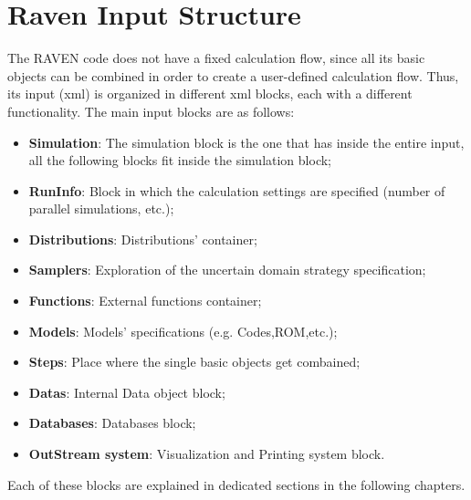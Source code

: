 \section{Raven Input Structure  \\ \vspace{2 mm} {\small }}
The RAVEN code does not have a fixed calculation flow, since all its basic objects can be combined in order to create a user-defined calculation flow. Thus, its input (xml) is organized in different xml blocks, each with a different functionality. 
The main input blocks are as follows:
\begin{itemize}
\item \textbf{Simulation}: The simulation block is the one that has inside the entire input, all the following blocks fit inside the simulation block;
\item \textbf{RunInfo}: Block in which the calculation settings are specified (number of parallel simulations, etc.);
\item \textbf{Distributions}: Distributions' container;
\item \textbf{Samplers}: Exploration of the uncertain domain strategy specification;
\item \textbf{Functions}: External functions container;
\item \textbf{Models}: Models' specifications (e.g. Codes,ROM,etc.);
\item \textbf{Steps}: Place where the single basic objects get combained;
\item \textbf{Datas}: Internal Data object block;
\item \textbf{Databases}: Databases block;
\item \textbf{OutStream system}: Visualization and Printing system block.
\end{itemize} 
Each of these blocks are explained in dedicated sections in the following chapters. 


